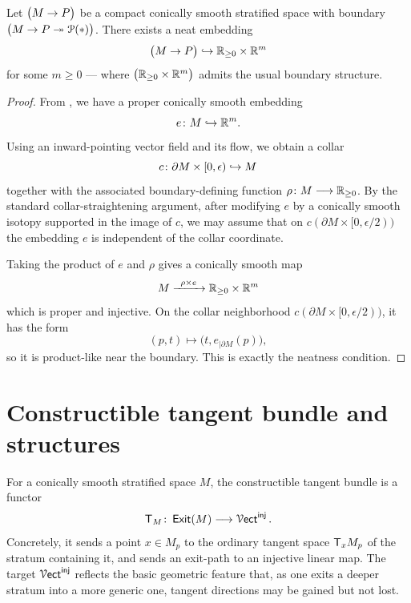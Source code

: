 \begin{proposition}
    \label{ch4:: prop: neat embedding strat}
    Let $\big(M \rightarrow P\big)$ be a compact conically smooth stratified space with boundary $\big(M \rightarrow P \twoheadrightarrow \mathcal P(*)\big)$. There exists a neat embedding 
    \begin{equation}
        \big(M \rightarrow P\big) \hookrightarrow \mathbb R_{\geq 0} \times \mathbb R^{m}
    \end{equation}
    for some $m \geq 0$ --- where $\big(\mathbb R_{\geq 0} \times \mathbb R^{m}\big)$ admits the usual boundary structure.
\end{proposition}
\begin{proof}
    From , we have a proper conically smooth embedding 
    \begin{equation}
        e \colon M \hookrightarrow \mathbb R^{m}.
    \end{equation}
    Using an inward-pointing vector field and its flow, we obtain a collar
    \begin{equation}
        c\colon \partial M\times [0,\epsilon) \hookrightarrow M
    \end{equation}
    together with the associated boundary-defining function $\rho \colon M \longrightarrow \mathbb R_{\geq 0}$. By the standard collar-straightening argument, after modifying $e$ by a conically smooth isotopy supported in the image of $c$, we may assume that on $c(\partial M\times [0,\epsilon/2))$ the embedding $e$ is independent of the collar coordinate.

    Taking the product of $e$ and $\rho$ gives a conically smooth map 
    \begin{equation}
        M \xrightarrow{\;\; \rho \times e \;\;} \mathbb R_{\geq 0} \times \mathbb R^{m}
    \end{equation}
    which is proper and injective. On the collar neighborhood $c(\partial M\times [0,\epsilon/2))$, it has the form
    \begin{equation}
        (p,t)\longmapsto \big(t,e_{|\partial M}(p)\big),
    \end{equation}
    so it is product-like near the boundary. This is exactly the neatness condition.
\end{proof}


\section{Constructible tangent bundle and structures}

For a conically smooth stratified space $M$, the constructible tangent bundle is a functor
\begin{equation}
    \mathsf T_M \colon \operatorname{\sf Exit}(M)\longrightarrow \operatorname{\mathcal V{\sf ect}}^{\operatorname{\mathsf{inj}}}.
\end{equation}
Concretely, it sends a point $x\in M_p$ to the ordinary tangent space $\mathsf T_xM_p$ of the stratum containing it, and sends an exit-path to an injective linear map. The target $\operatorname{\mathcal V{\sf ect}}^{\operatorname{\mathsf{inj}}}$ reflects the basic geometric feature that, as one exits a deeper stratum into a more generic one, tangent directions may be gained but not lost.

